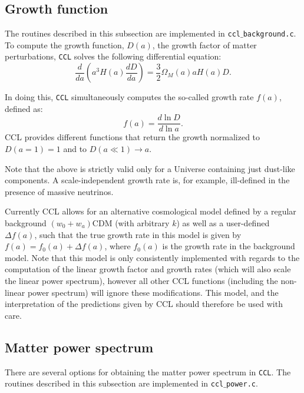 \documentclass[\docopts]{\docclass}
\begin{document}
\subsection{Growth function}
\label{sec:growth}

The routines described in this subsection are implemented in {\tt ccl$\_$background.c}.
To compute the growth function, $D(a)$, the growth factor of matter perturbations, {\tt CCL} solves the following differential equation:
\begin{equation}
  \frac{d}{da}\left(a^3H(a)\frac{dD}{da}\right)=\frac{3}{2}\Omega_M(a)aH(a)D.
\end{equation}

In doing this, {\tt CCL} simultaneously computes the so-called growth rate $f(a)$, defined as:
\begin{equation}
  f(a)=\frac{d\ln D}{d\ln a}.
\end{equation}
CCL provides different functions that return the growth normalized to $D(a=1)=1$ and to $D(a\ll1)\rightarrow a$.

Note that the above is strictly valid only for a Universe containing just dust-like components. A scale-independent growth rate is, for example, ill-defined in the presence of massive neutrinos.

Currently CCL allows for an alternative cosmological model defined by a regular background $(w_0+w_a)$CDM (with arbitrary $k$) as well as a user-defined $\Delta f(a)$, such that the true growth rate in this model is given by $f(a)=f_0(a)+\Delta f(a)$, where $f_0(a)$ is the growth rate in the background model. Note that this model is only consistently implemented with regards to the computation of the linear growth factor and growth rates (which will also scale the linear power spectrum), however all other CCL functions (including the non-linear power spectrum) will ignore these modifications. This model, and the interpretation of the predictions given by CCL should therefore be used with care.

\subsection{Matter power spectrum}
\label{sec:power}

There are several options for obtaining the matter power spectrum in {\tt CCL}.
The routines described in this subsection are implemented in {\tt ccl$\_$power.c}.
\end{document}
